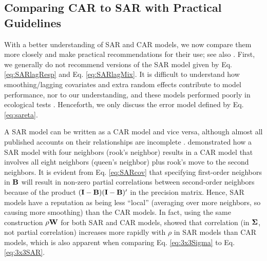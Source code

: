 \documentclass[11pt, titlepage]{article}\usepackage[]{graphicx}\usepackage[]{color}
\begin{document}
\begin{spacing}{1.9}
\begin{flushleft}
\subsection*{Comparing CAR to SAR with Practical Guidelines}

With a better understanding of SAR and CAR models, we now compare them more closely and make practical recommendations for their use; see also \citet{Wall:clos:2004}. First, we generally do not recommend versions of the SAR model given by Eq. \ref{eq:SARlagResp} and Eq. \ref{eq:SARlagMix}.  It is difficult to understand how smoothing/lagging covariates and extra random effects contribute to model performance, nor to our understanding, and these models performed poorly in ecological tests \citep{Dorm:etal:meth:2007, Kiss:Carl:spat:2008}. Henceforth, we only discuss the error model defined by Eq. \ref{eq:sareta}. 

A SAR model can be written as a CAR model and vice versa, although almost all published accounts on their relationships are incomplete \citep{Ver:Hank:Hoot:2017}. \citet[pg. 408]{Cres:stat:1993} demonstrated how a SAR model with four neighbors (rook's neighbor) results in a CAR model that involves all eight neighbors (queen's neighbor) plus rook's move to the second neighbors. It is evident from Eq. \ref{eq:SARcov} that specifying first-order neighbors in $\mathbf{B}$ will result in non-zero partial correlations between second-order neighbors because of the product $(\mathbf{I} - \mathbf{B})(\mathbf{I} - \mathbf{B})^{\prime}$ in the precision matrix.  Hence, SAR models have a reputation as being less ``local'' (averaging over more neighbors, so causing more smoothing) than the CAR models.  In fact, using the same construction $\rho\mathbf{W}$ for both SAR and CAR models, \citet{Wall:clos:2004} showed that correlation (in $\mbox{\boldmath $\Sigma$}$, not partial correlation) increases more rapidly with $\rho$ in SAR models than CAR models, which is also apparent when comparing Eq. \ref{eq:3x3Sigma} to Eq. \ref{eq:3x3SAR}. 


\end{flushleft}
\end{spacing}
\end{document}

